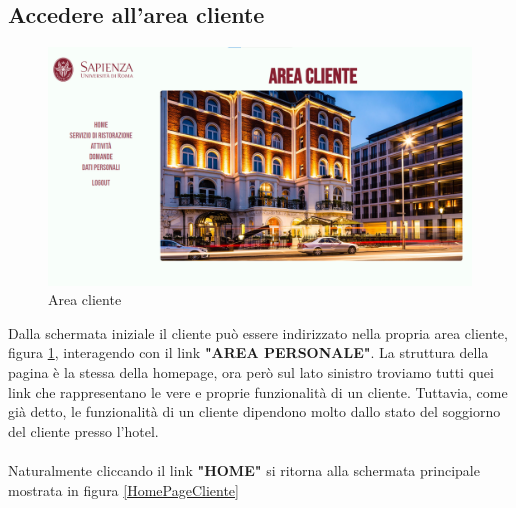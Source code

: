 \documentclass [a4paper, 12pt]{book}
\begin{document}
\subsection{Accedere all'area cliente}
\begin{figure}[!h]
\centering
\includegraphics[scale=0.3]{AreaCliente.png}
\caption{Area cliente}
\label{AreaCliente}
\end{figure}
Dalla schermata iniziale il cliente può essere indirizzato nella propria area cliente, figura \ref{AreaCliente}, interagendo con il link \textbf{"AREA PERSONALE"}. La struttura della pagina è la stessa della homepage, ora però sul lato sinistro troviamo tutti quei link che rappresentano le vere e proprie funzionalità di un cliente. Tuttavia, come già detto, le funzionalità di un cliente dipendono molto dallo stato del soggiorno del cliente presso l'hotel.\\\\
Naturalmente cliccando il link \textbf{"HOME"} si ritorna alla schermata principale mostrata in figura \ref{HomePageCliente}
\end{document}
